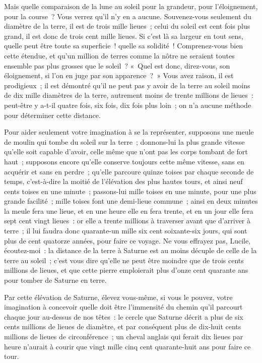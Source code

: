 \documentclass[french,twoside]{book} %
\begin{document}
Mais quelle comparaison de la lune au soleil pour la grandeur, pour l’éloignement, pour la course ? Vous verrez qu’il n’y en a aucune. Souvenez-vous seulement du diamètre de la terre, il est de trois mille lieues ; celui du soleil est cent fois plus grand, il est donc de trois cent mille lieues. Si c’est là sa largeur en tout sens, quelle peut être toute sa superficie ! quelle sa solidité ! Comprenez-vous bien cette étendue, et qu’un million de terres comme la nôtre ne seraient toutes ensemble pas plus grosses que le soleil ? « Quel est donc, direz-vous, son éloignement, si l’on en juge par son apparence ? » Vous avez raison, il est prodigieux ; il est démontré qu’il ne peut pas y avoir de la terre au soleil moins de dix mille diamètres de la terre, autrement moins de trente millions de lieues : peut-être y a-t-il quatre fois, six fois, dix fois plus loin ; on n’a aucune méthode pour déterminer cette distance.\par
Pour aider seulement votre imagination à se la représenter, supposons une meule de moulin qui tombe du soleil sur la terre ; donnons-lui la plus grande vitesse qu’elle soit capable d’avoir, celle même que n’ont pas les corps tombant de fort haut ; supposons encore qu’elle conserve toujours cette même vitesse, sans en acquérir et sans en perdre ; qu’elle parcoure quinze toises par chaque seconde de temps, c’est-à-dire la moitié de l’élévation des plus hautes tours, et ainsi neuf cents toises en une minute ; passons-lui mille toises en une minute, pour une plus grande facilité ; mille toises font une demi-lieue commune ; ainsi en deux minutes la meule fera une lieue, et en une heure elle en fera trente, et en un jour elle fera sept cent vingt lieues : or elle a trente millions à traverser avant que d’arriver à terre ; il lui faudra donc quarante-un mille six cent soixante-six jours, qui sont plus de cent quatorze années, pour faire ce voyage. Ne vous effrayez pas, Lucile, écoutez-moi : la distance de la terre à Saturne est au moins décuple de celle de la terre au soleil ; c’est vous dire qu’elle ne peut être moindre que de trois cents millions de lieues, et que cette pierre emploierait plus d’onze cent quarante ans pour tomber de Saturne en terre.\par
Par cette élévation de Saturne, élevez vous-même, si vous le pouvez, votre imagination à concevoir quelle doit être l’immensité du chemin qu’il parcourt chaque jour au-dessus de nos têtes : le cercle que Saturne décrit a plus de six cents millions de lieues de diamètre, et par conséquent plus de dix-huit cents millions de lieues de circonférence ; un cheval anglais qui ferait dix lieues par heure n’aurait à courir que vingt mille cinq cent quarante-huit ans pour faire ce tour.\par
\end{document}
